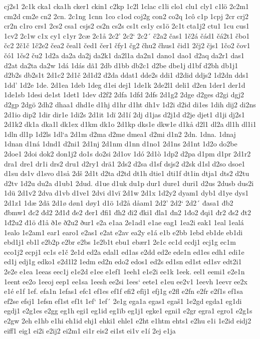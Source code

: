 cj2s1
2c1k
cka1
cka1h
cker1
ckin1
c2kp
1c2l
1clac
c1li
clo1
clu1
cly1
c1lö
2c2m1
cm2d
cm2e
cn2
2cn.
2c1ng
1cnn
1co
c1od
coj2g
con2
co2q
1cô
c1p
1cpj
2cr
crj2
cr2n
c1ro
crs1
2cs2
csa1
csjs2
cs2n
cs2s
cs1t
cs1y
cs1ö
2c1t
cta1j2
ctu1
1cu
cus1
1cv2
2c1w
c1x
cy1
c1yr
2cæ
2c1å
2c2'
2c2`
2c2´
č2a2
čas1
1č2á
čád1
čá2t1
čbo1
čc2
2č1č
1č2e2
čea2
čeal1
čed1
čer1
čfy1
čg2
čhu2
čhus1
čid1
2čj2
čjs1
1čo2
čov1
čó1
1čs2
ču2
1d2a
da2a
da2j
da2k1
da2l1a
da2n1
dano1
dao1
d2aq
da2r1
das1
d2at
da2ta
da2w
1dá
1dás
dã1
2db
d1bb
db2c1
d2be
dbe1j
d1bf
d2bh
db1j1
d2b2s
db2s1t
2d1c2
2d1č
2d1d2
d2da
ddat1
dde2s
ddi1
d2did
ddjs2
1d2dn
dds1
1dd'
1d2e
1de.
2d1ea
1deb
1deg
d1ei
dej1
1de1k
2de2l1
deli1
d2en
1der1
der1d
1de1sb
1desi
de1st
1det1
1dev
d2f2
2dfa
1dfd
2dfs
2d1g2
2dge
d2ges
d2gi
dgj2
d2gp
2dgö
2dh2
dhaa1
dhd1e
d1hj
d1hr
d1ht
dh1v
1d2i
d2id
di1es
1dih
dij2
di2ns
2d1io
dip2
1dir
dir1e
1di2s
2d1it
1dï
2d1í
2dj
d1jas
d2j1d
d2je
djet1
d1ji
dj2s1
2d1k2
dk1a
dka1l
dk1ex
d1km
dk1o
2d1kp
dks1e
dkw1e
d1kå
d2l1
dl2a
dl1h
dl1i1
1dln
dl1p
1d2ls
1dl`a
2d1m
d2ma
d2me
dmea1
d2mi
d1n2
2dn.
1dna.
1dnaj
1dnan
d1ná
1dnd1
d2ni1
2d1nj
2d1nm
d1nn
d1no1
2d1ns
2d1nt
1d2o
do2be
2doe1
2doi
dok2
don1j2
do1s
do2si
2d1ov
1dó
2d1ò
1dp2
d2pa
d1pm
d1pr
2d1r2
dra1
dre1
dr1i
drs2
dru1
d2ry1
drä1
2ds2
d2sa
d1sf
dsjs2
d2sk
d1sl
d2so
dsoe1
d1su
ds1v
d1svo
d1så
2dš
2d1t
d2ta
d2td
dt1h
dtie1
dti1f
dt1in
dtja1
dts2
d2tu
d2tv
1d2u
du2a
d1ub1
2dud.
d1ue
d1uk
du1p
dur1
dure1
duri1
d2us
2dusb
dus2i
1dü
2d1v2
2dva
d1vb
d1ve1
2dvi
d1vï
2d1w
2d1x
1d2y2
dyam1
dyb1
d1ye
dys1
2d1z1
1dæ
2dä
2d1ø
døn1
døy1
d1ö
1d2å
dåam1
2d2'
2d2`
2d2´
đasa1
đb2
đbmw1
đc2
đd2
2đ1đ
đe2
đer1
đfi1
đh2
đi2
đki1
đla1
đn2
1đo2
đqi1
đr2
đs2
đt2
1đ2u2
đ1ö
đ1å
ð1e
ð2u2
ður1
e2a
e1aa
2e1ad1
e1ae
eag1
1ea2i
eak1
1eal
1ealá
1ealo
1e2am1
ear1
earo1
e2as1
e2at
e2av
ea2y
e1á
e1b
e2bb
1ebd
eb1de
eb1di
ebd1j1
eb1l
e2b2p
e2br
e2bs
1e2b1t
ebu1
ebær1
2e1c
ec1d
ecdj1
ecj1g
ec1m
eco1j2
ecpj1
ec1s
e1č
2e1d
ed2a
edal1
ed1as
e2dd
ed2e
ede1n
ed1es
edh1
edi1e
ed1j
edj1g
edko1
e2d1l2
1edm
ed2n
edo2
edos1
ed2s
ed1sn
ed1st
ed1sv
edt2i1
2e2e
e1ea
1eeas
eec1j
e1e2d
e1ee
e1ef1
1eeh1
e1e2i
ee1k
1eek.
eel1
eemi1
e2e1n
1eent
ee2o
1eeoj
eep1
ee1sa
1eesh
ee2si
1ees`
eete1
e1eu
ee2v1
1eevh
1eevr
ee2x
e1é
e1f
1ef.
efa1n
1efas1
efc1
ef1es
ef1f
efi2
efïj1
efj1g
e2fl
e2fn
e2fr
e2f1s
ef1sa
ef2se
efsj1
1efsn
ef1st
ef1t
1ef`
1ef´
2e1g
ega1a
egas1
egaš1
1e2gd
egda1
eg1di
egdj1
e2g1es
e2gg
eg1h
egi1
eg1id
eg1ïb
eg1j1
egke1
egni1
e2gr
egra1
egro1
e2g1s
e2gw
2eh
e1hb
e1hi
eh1id
ehj1
ehki1
ehle1
e2ht
e1htm
ehts1
e2hu
e1i
1e2id
eidj2
eiff1
eig1
ei2i
e2ij2
ei2m1
ei1r
eis2
ei1st
ei1v
e1í
2ej
e1ja
